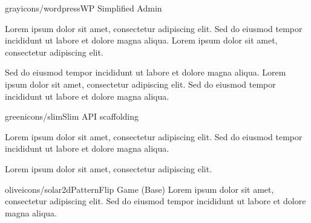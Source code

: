 \documentclass{article}
\begin{document}
\begin{slbox}{gray}{icons/wordpress}{WP Simplified Admin}{
	Lorem ipsum dolor sit amet, consectetur adipiscing elit. Sed do eiusmod tempor incididunt ut labore et dolore magna aliqua. Lorem ipsum dolor sit amet, consectetur adipiscing elit.
	\par Sed do eiusmod tempor incididunt ut labore et dolore magna aliqua. Lorem ipsum dolor sit amet, consectetur adipiscing elit. Sed do eiusmod tempor incididunt ut labore et dolore magna aliqua.
	}
\end{slbox}
\vspace{0.5cm}

\begin{slbox}{green}{icons/slim}{Slim API scaffolding}{
	Lorem ipsum dolor sit amet, consectetur adipiscing elit. Sed do eiusmod tempor incididunt ut labore et dolore magna aliqua.
	\par Lorem ipsum dolor sit amet, consectetur adipiscing elit.
	}
\end{slbox}
\vspace{0.5cm}

\begin{slbox}{olive}{icons/solar2d}{PatternFlip Game (Base)}{
	Lorem ipsum dolor sit amet, consectetur adipiscing elit. Sed do eiusmod tempor incididunt ut labore et dolore magna aliqua.
	}
\end{slbox}
\vspace{0.5cm}
\end{document}
